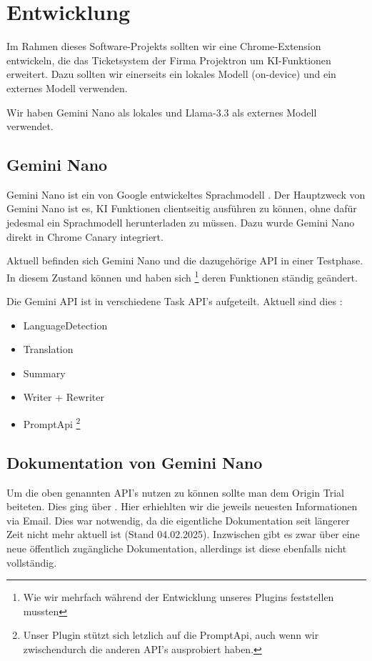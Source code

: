 \section{Entwicklung}

Im Rahmen dieses Software-Projekts sollten wir eine Chrome-Extension entwickeln, die das Ticketsystem der Firma Projektron um KI-Funktionen erweitert. Dazu sollten wir einerseits ein lokales Modell (on-device) und ein externes Modell verwenden.

Wir haben Gemini Nano als lokales und Llama-3.3 als externes Modell verwendet.

\subsection{Gemini Nano}

Gemini Nano ist ein von Google entwickeltes Sprachmodell \cite{gemini-nano}. Der Hauptzweck von Gemini Nano ist es, KI Funktionen clientseitig ausführen zu können, ohne dafür jedesmal ein Sprachmodell herunterladen zu müssen. Dazu wurde Gemini Nano direkt in Chrome Canary integriert. \cite{gemini-nano-build-in-ai}

Aktuell befinden sich Gemini Nano und die dazugehörige API in einer Testphase. In diesem Zustand können und haben sich \footnote{Wie wir mehrfach während der Entwicklung unseres Plugins feststellen mussten} deren Funktionen ständig geändert. \cite{gemini-nano-build-in-ai}

Die Gemini API ist in verschiedene Task API's aufgeteilt. Aktuell sind dies \cite{gemini-nano-apis}:
\begin{itemize}
    \item LanguageDetection
    \item Translation
    \item Summary
    \item Writer + Rewriter
    \item PromptApi \footnote{Unser Plugin stützt sich letzlich auf die PromptApi, auch wenn wir zwischendurch die anderen API's ausprobiert haben.}
\end{itemize} 

\subsection{Dokumentation von Gemini Nano}

Um die oben genannten API's nutzen zu können sollte man dem Origin Trial beiteten. Dies ging über \cite{gemini-nano-origin-trial}. Hier erhiehlten wir die jeweils neuesten Informationen via Email. Dies war notwendig, da die eigentliche Dokumentation \cite{old-doku-language-detection-api, old-doku-translation-api,old-doku-summarization-api,old-doku-writer-api,old-doku-prompt-api} seit längerer Zeit nicht mehr aktuell ist (Stand 04.02.2025). Inzwischen gibt es zwar über \cite{gemini-nano-build-in-ai} eine neue öffentlich zugängliche Dokumentation, allerdings ist diese ebenfalls nicht vollständig.

